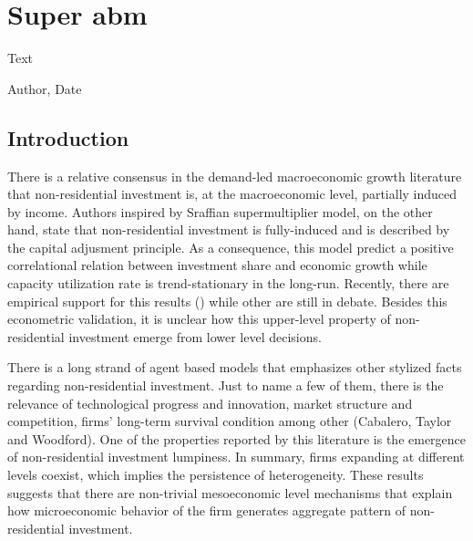 \documentclass[12pt,openright,oneside,a4paper,english,sumario=tradicional]{gpsabntex}
\numberwithin{listing}{chapter}
\begin{document}
\tableofcontents*
\thispagestyle{empty}

\mainmatter
\cleardoublepage
\pagestyle{plain} %
\renewcommand{\thepage}{\arabic{page}}  %


\chapter{Super abm}
\label{sec:org61cf0f9}

\epigraph{Text}{Author, Date}

\section{Introduction}
\label{sec:orgfc32231}
There is a relative consensus in the demand-led macroeconomic growth literature that non-residential investment is, at the macroeconomic level, partially induced by income.
Authors inspired by Sraffian supermultiplier model, on the other hand, state that non-residential investment is fully-induced and is described by the capital adjusment principle.
As a consequence, this model predict a positive correlational relation between investment share and economic growth while capacity utilization rate is trend-stationary in the long-run.
Recently, there are empirical support for this results () while other are still in debate.
Besides this econometric validation, it is unclear how this upper-level property of non-residential investment emerge from lower level decisions.

There is a long strand of agent based models that emphasizes other stylized facts regarding non-residential investment.
Just to name a few of them, there is the relevance of technological progress and innovation, market structure and competition, firms' long-term survival condition among other (Cabalero, Taylor and Woodford).
One of the properties reported by this literature is the emergence of non-residential investment lumpiness.
In summary, firms expanding at different levels coexist, which implies the persistence of heterogeneity.
These results suggests that there are non-trivial mesoeconomic level mechanisms that explain how microeconomic behavior of the firm generates aggregate pattern of non-residential investment.
\end{document}
